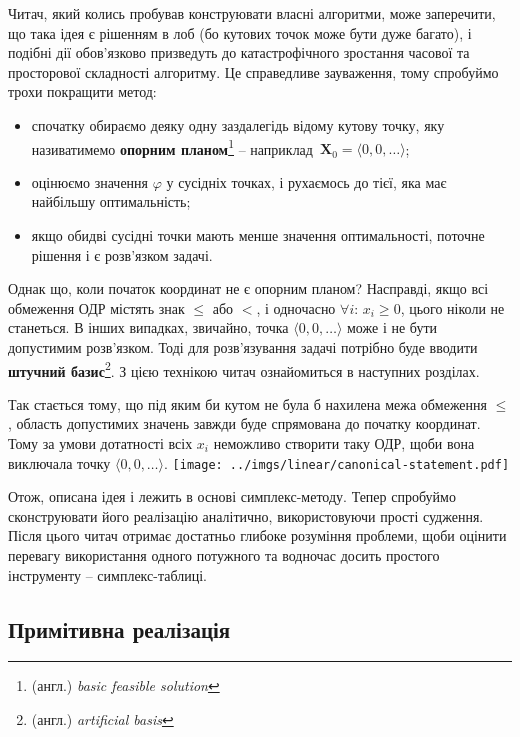 \documentclass[\main/book.tex]{subfiles}
\begin{document}
Читач, який колись пробував конструювати власні алгоритми, може заперечити, що така ідея є рішенням \flqq{}в лоб\frqq{} (бо кутових точок може бути дуже багато), і подібні дії обов'язково призведуть до катастрофічного зростання часової та просторової складності алгоритму. Це справедливе зауваження, тому спробуймо трохи покращити метод:

\begin{itemize}
 \item спочатку обираємо деяку одну заздалегідь відому кутову точку, яку називатимемо \textbf{опорним планом}\footnote{(англ.) \textit{basic feasible solution}} -- наприклад~$\mathbf{X}_0 = {\langle 0, 0, \ldots \rangle}$;
 \item оцінюємо значення $\varphi$ у сусідніх точках, і рухаємось до тієї, яка має найбільшу оптимальність;
 \item якщо обидві сусідні точки мають менше значення оптимальності, поточне рішення і є розв'язком задачі.
\end{itemize}

Однак що, коли початок координат не є опорним планом? Насправді, якщо всі обмеження ОДР містять знак \flqq{}$\leq$\frqq{} або \flqq{}$<$\frqq{}, і одночасно ${\forall i:}\, {x_i \geq 0}$, цього ніколи не станеться. В інших випадках, звичайно, точка ${\langle 0, 0, \ldots \rangle}$ може і не бути допустимим розв'язком. Тоді для розв'язування задачі потрібно буде вводити \textbf{штучний базис}\footnote{(англ.) \textit{artificial basis}}. З цією технікою читач ознайомиться в наступних розділах.

\begin{note}
 Так стається тому, що під яким би кутом не була б нахилена межа обмеження \flqq{}$\leq$\frqq{}, область допустимих значень завжди буде спрямована до початку координат. Тому за умови дотатності всіх $x_i$ неможливо створити таку ОДР, щоби вона виключала точку ${\langle 0, 0, \ldots \rangle}$.
 \center
 \texttt{[image: ../imgs/linear/canonical-statement.pdf]}
\end{note}

Отож, описана ідея і лежить в основі симплекс-методу. Тепер спробуймо сконструювати його реалізацію аналітично, використовуючи прості судження. Після цього читач отримає достатньо глибоке розуміння проблеми, щоби оцінити перевагу використання одного потужного та водночас досить простого інструменту -- симплекс-таблиці.

\subsection{Примітивна реалізація}
\end{document}
